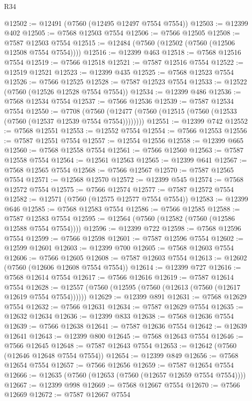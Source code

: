 \begin{lexlean}{R34}
\begin{coremodule}
@12502 := @12491 (@7560 (@12495 @12497 @7554 @7554))
@12503 := @12399 @402
@12505 := @7568 @12503 @7554
@12506 := @7566 @12505
@12508 := @7587 @12503 @7554
@12515 := @12484 (@7560 (@12502 (@7560 (@12506 @12508 @7554 @7554))))
@12516 := @12399 @463
@12518 := @7568 @12516 @7554
@12519 := @7566 @12518
@12521 := @7587 @12516 @7554
@12522 := @12519 @12521
@12523 := @12399 @435
@12525 := @7568 @12523 @7554
@12526 := @7566 @12525
@12528 := @7587 @12523 @7554
@12533 := @12522 (@7560 (@12526 @12528 @7554 @7554))
@12534 := @12399 @486
@12536 := @7568 @12534 @7554
@12537 := @7566 @12536
@12539 := @7587 @12534 @7554
@12550 := @7708
    (@7560 (@12477 (@7560 (@12515 (@7560 (@12533 (@7560 (@12537 @12539 @7554 @7554))))))))
@12551 := @12399 @742
@12552 := @7568 @12551
@12553 := @12552 @7554
@12554 := @7566 @12553
@12556 := @7587 @12551 @7554
@12557 := @12554 @12556
@12558 := @12399 @665
@12560 := @7568 @12558 @7554
@12561 := @7566 @12560
@12563 := @7587 @12558 @7554
@12564 := @12561 @12563
@12565 := @12399 @641
@12567 := @7568 @12565 @7554
@12568 := @7566 @12567
@12570 := @7587 @12565 @7554
@12571 := @12568 @12570
@12572 := @12399 @545
@12574 := @7568 @12572 @7554
@12575 := @7566 @12574
@12577 := @7587 @12572 @7554
@12582 := @12571 (@7560 (@12575 @12577 @7554 @7554))
@12583 := @12399 @646
@12585 := @7568 @12583 @7554
@12586 := @7566 @12585
@12588 := @7587 @12583 @7554
@12595 := @12564 (@7560 (@12582 (@7560 (@12586 @12588 @7554 @7554))))
@12596 := @12399 @722
@12598 := @7568 @12596 @7554
@12599 := @7566 @12598
@12601 := @7587 @12596 @7554
@12602 := @12599 @12601
@12603 := @12399 @700
@12605 := @7568 @12603 @7554
@12606 := @7566 @12605
@12608 := @7587 @12603 @7554
@12613 := @12602 (@7560 (@12606 @12608 @7554 @7554))
@12614 := @12399 @727
@12616 := @7568 @12614 @7554
@12617 := @7566 @12616
@12619 := @7587 @12614 @7554
@12628 := @12557 (@7560 (@12595 (@7560 (@12613 (@7560 (@12617 @12619 @7554 @7554))))))
@12629 := @12399 @891
@12631 := @7568 @12629 @7554
@12632 := @7566 @12631
@12634 := @7587 @12629 @7554
@12635 := @12632 @12634
@12636 := @12399 @833
@12638 := @7568 @12636 @7554
@12639 := @7566 @12638
@12641 := @7587 @12636 @7554
@12642 := @12639 @12641
@12643 := @12399 @800
@12645 := @7568 @12643 @7554
@12646 := @7566 @12645
@12648 := @7587 @12643 @7554
@12653 := @12642 (@7560 (@12646 @12648 @7554 @7554))
@12654 := @12399 @849
@12656 := @7568 @12654 @7554
@12657 := @7566 @12656
@12659 := @7587 @12654 @7554
@12666 := @12635 (@7560 (@12653 (@7560 (@12657 @12659 @7554 @7554))))
@12667 := @12399 @998
@12669 := @7568 @12667 @7554
@12670 := @7566 @12669
@12672 := @7587 @12667 @7554

\end{coremodule}
\end{lexlean}
